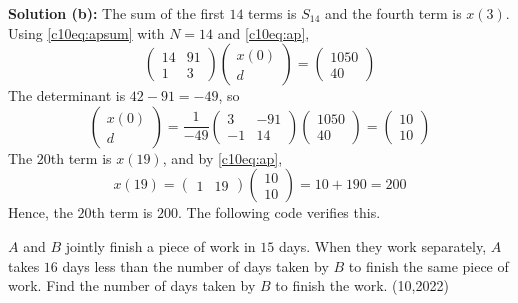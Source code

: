\textbf{Solution (b):} The sum of the first $14$ terms is $S_{14}$ and the fourth term is $x(3)$. Using \eqref{c10eq:apsum} with $N = 14$ and \eqref{c10eq:ap},
\begin{equation}
\begin{pmatrix} 14 & 91 \\ 1 & 3 \end{pmatrix}\begin{pmatrix} x(0) \\ d \end{pmatrix} = \begin{pmatrix} 1050 \\ 40 \end{pmatrix}
\end{equation}
The determinant is $42 - 91 = -49$, so
\begin{equation}
\begin{pmatrix} x(0) \\ d \end{pmatrix} = \frac{1}{-49}\begin{pmatrix} 3 & -91 \\ -1 & 14 \end{pmatrix}\begin{pmatrix} 1050 \\ 40 \end{pmatrix} = \begin{pmatrix} 10 \\ 10 \end{pmatrix}
\end{equation}
The $20$th term is $x(19)$, and by \eqref{c10eq:ap},
\begin{equation}
x(19) = \begin{pmatrix} 1 & 19 \end{pmatrix}\begin{pmatrix} 10 \\ 10 \end{pmatrix} = 10 + 190 = 200
\end{equation}
Hence, the $20$th term is $200$. The following code verifies this.

\nopagebreak[4]
\begin{center}
\end{center}

\clearpage
\item $A$ and $B$ jointly finish a piece of work in $15$ days. When they work separately, $A$ takes $16$ days less than the number of days taken by $B$ to finish the same piece of work. Find the number of days taken by $B$ to finish the work. \hfill (10,2022)

